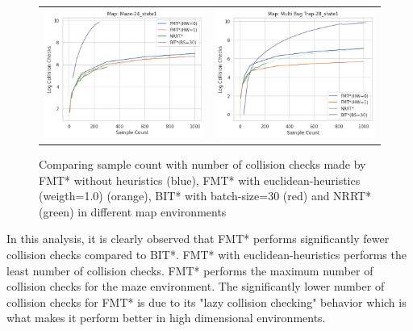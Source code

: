 \documentclass{article}
\begin{document}
\begin{figure}
{\begin{tabular}{cc}
			\includegraphics[scale=0.45]{scVcc_Maze-24_state1.png} & \includegraphics[scale=0.45]{scVcc_Multi Bug Trap-28_state1.png}  \\
		\end{tabular}
	}
	\caption{Comparing sample count with number of collision checks made by FMT* without heuristics (blue), FMT* with euclidean-heuristics (weigth=1.0) (orange), BIT* with batch-size=30 (red) and NRRT* (green) in different map environments}
        \label{mets:scVcc}
\end{figure}

In this analysis, it is clearly observed that FMT* performs significantly fewer collision checks compared to BIT*. FMT* with euclidean-heuristics performs the least number of collision checks. FMT* performs the maximum number of collision checks for the maze environment. The significantly lower number of collision checks for FMT* is due to its "lazy collision checking" behavior which is what makes it perform better in high dimensional environments. 
\end{document}
